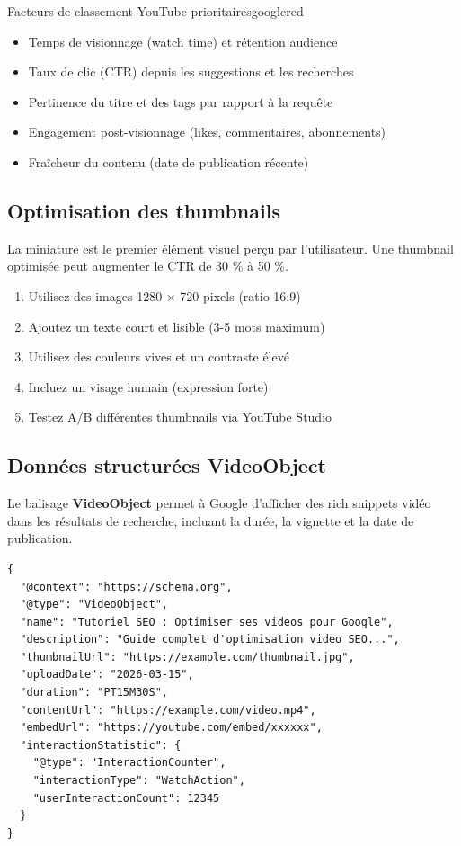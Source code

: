 \documentclass[12pt,a4paper,twoside]{report}
\newcommand{\keyword}[1]{\textbf{\textcolor{googleblue}{#1}}}
\begin{document}
\begin{mybox}{Facteurs de classement YouTube prioritaires}{googlered}
\begin{itemize}
    \item Temps de visionnage (watch time) et rétention audience
    \item Taux de clic (CTR) depuis les suggestions et les recherches
    \item Pertinence du titre et des tags par rapport à la requête
    \item Engagement post-visionnage (likes, commentaires, abonnements)
    \item Fraîcheur du contenu (date de publication récente)
\end{itemize}
\end{mybox}

\subsection{Optimisation des thumbnails}

La miniature est le premier élément visuel perçu par l'utilisateur. Une thumbnail optimisée peut augmenter le CTR de 30 \% à 50 \%.

\begin{enumerate}
    \item Utilisez des images 1280 × 720 pixels (ratio 16:9)
    \item Ajoutez un texte court et lisible (3-5 mots maximum)
    \item Utilisez des couleurs vives et un contraste élevé
    \item Incluez un visage humain (expression forte)
    \item Testez A/B différentes thumbnails via YouTube Studio
\end{enumerate}

\subsection{Données structurées VideoObject}

Le balisage \keyword{VideoObject} permet à Google d'afficher des rich snippets vidéo dans les résultats de recherche, incluant la durée, la vignette et la date de publication.

\begin{lstlisting}[style=htmlcode,caption={Schema VideoObject au format JSON-LD}]
{
  "@context": "https://schema.org",
  "@type": "VideoObject",
  "name": "Tutoriel SEO : Optimiser ses videos pour Google",
  "description": "Guide complet d'optimisation video SEO...",
  "thumbnailUrl": "https://example.com/thumbnail.jpg",
  "uploadDate": "2026-03-15",
  "duration": "PT15M30S",
  "contentUrl": "https://example.com/video.mp4",
  "embedUrl": "https://youtube.com/embed/xxxxxx",
  "interactionStatistic": {
    "@type": "InteractionCounter",
    "interactionType": "WatchAction",
    "userInteractionCount": 12345
  }
}
\end{lstlisting}
\end{document}
